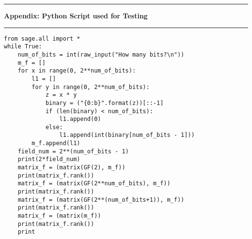 \documentclass[11pt]{article}
\newcommand\newAppendix[2]{\vspace{.25in}\hrule\textbf{#1 #2}\vspace{.5em}\hrule\vspace{.10in}}
\begin{document}
\proof 
\newpage
\newAppendix{Appendix:}{Python Script used for Testing}
\begin{lstlisting}
from sage.all import *
while True:
    num_of_bits = int(raw_input("How many bits?\n"))
    m_f = []
    for x in range(0, 2**num_of_bits):
        l1 = []
        for y in range(0, 2**num_of_bits):
            z = x * y
            binary = ("{0:b}".format(z))[::-1]
            if (len(binary) < num_of_bits):
                l1.append(0)
            else:
                l1.append(int(binary[num_of_bits - 1]))
        m_f.append(l1)
    field_num = 2**(num_of_bits - 1)
    print(2*field_num)
    matrix_f = (matrix(GF(2), m_f))
    print(matrix_f.rank())
    matrix_f = (matrix(GF(2**num_of_bits), m_f))
    print(matrix_f.rank())
    matrix_f = (matrix(GF(2**(num_of_bits+1)), m_f))
    print(matrix_f.rank())
    matrix_f = (matrix(m_f))
    print(matrix_f.rank())
    print
\end{lstlisting}
\end{document}
